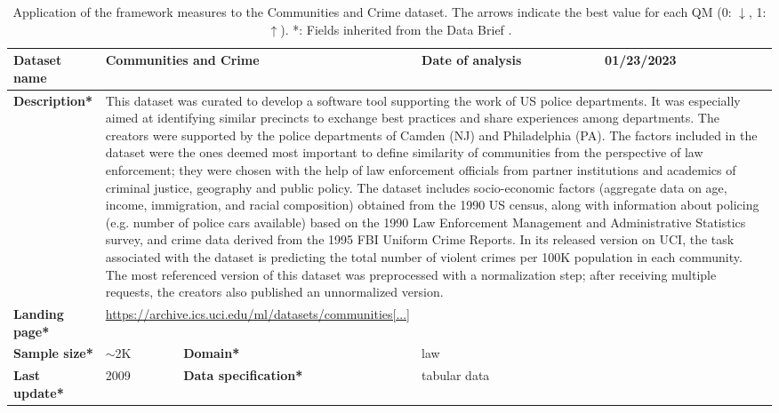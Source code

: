 \begin{table}[h]
    \caption{Application of the framework measures to the Communities and Crime dataset. The arrows indicate the best value for each QM (0: $\downarrow$, 1: $\uparrow$). *: Fields inherited from the Data Brief \cite{fabrisAlgorithmicFairnessDatasets2022}.}
    \label{tab:CommunitiesandCrime}
    \begin{tabular}{|p{3cm}|p{1.9cm}p{3cm}p{2.6cm}p{1.6cm}|}
        \hline
        \textbf{Dataset name} & \multicolumn{2}{l|}{Communities and Crime} & \multicolumn{1}{l|}{\textbf{Date of analysis}} & 01/23/2023 \\ \hline
        \textbf{Description*} & \multicolumn{4}{p{10cm}|}{This dataset was curated to develop a software tool supporting the work of US police departments. It was especially aimed at identifying similar precincts to exchange best practices and share experiences among departments. The creators were supported by the police departments of Camden (NJ) and Philadelphia (PA). The factors included in the dataset were the ones deemed most important to define similarity of communities from the perspective of law enforcement; they were chosen with the help of law enforcement officials from partner institutions and academics of criminal justice, geography and public policy. The dataset includes socio-economic factors (aggregate data on age, income, immigration, and racial composition) obtained from the 1990 US census, along with information about policing (e.g. number of police cars available) based on the 1990 Law Enforcement Management and Administrative Statistics survey, and crime data derived from the 1995 FBI Uniform Crime Reports. In its released version on UCI, the task associated with the dataset is predicting the total number of violent crimes per 100K population in each community. The most referenced version of this dataset was preprocessed with a normalization step; after receiving multiple requests, the creators also published an unnormalized version.} \\ \hline
        \textbf{Landing page*} & \multicolumn{4}{l|}{\href{https://archive.ics.uci.edu/ml/datasets/communities+and+crime}{https://archive.ics.uci.edu/ml/datasets/communities[...]}} \\ \hline
        \textbf{Sample size*} & $\sim$2K & \multicolumn{1}{|l}{\textbf{Domain*}} & \multicolumn{2}{|l|}{law}  \\ \hline
        \textbf{Last update*} & 2009 & \multicolumn{1}{|p{3cm}}{\textbf{Data specification*}} & \multicolumn{2}{|l|}{tabular data} \\ \hline

\end{tabular}
\end{table}
